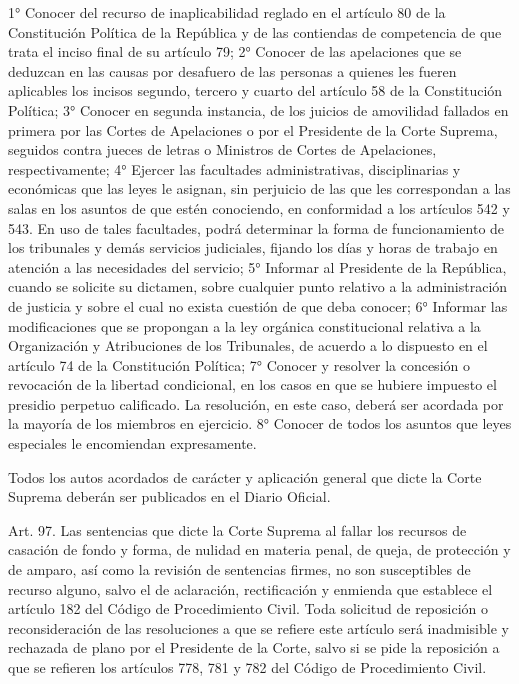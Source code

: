     1°  Conocer del recurso de inaplicabilidad reglado en el artículo 80 de la Constitución Política de la República y de las contiendas de competencia de que trata el inciso final de su artículo 79;
    2°  Conocer de las apelaciones que se deduzcan en las causas por desafuero de las personas a quienes les fueren aplicables los incisos segundo, tercero y cuarto del artículo 58 de la Constitución Política;
    3°  Conocer en segunda instancia, de los juicios de amovilidad fallados en primera por las Cortes de Apelaciones o por el Presidente de la Corte Suprema, seguidos contra jueces de letras o Ministros de Cortes de Apelaciones, respectivamente;
    4°  Ejercer las facultades administrativas, disciplinarias y económicas que las leyes le asignan, sin perjuicio de las que les correspondan a las salas en los asuntos de que estén conociendo, en conformidad a los artículos 542 y 543. En uso de tales facultades, podrá determinar la forma de funcionamiento de los tribunales y demás servicios judiciales, fijando los días y horas de trabajo en atención a las necesidades del servicio;
    5°  Informar al Presidente de la República, cuando se solicite su dictamen, sobre cualquier punto relativo a la administración de justicia y sobre el cual no exista cuestión de que deba conocer;
    6°  Informar las modificaciones que se propongan a la ley orgánica constitucional relativa a la Organización y Atribuciones de los Tribunales, de acuerdo a lo dispuesto en el artículo 74 de la Constitución Política;
    7°  Conocer y resolver la concesión o revocación de la libertad condicional, en los casos en que se hubiere impuesto el presidio perpetuo calificado.
    La resolución, en este caso, deberá ser acordada por la mayoría de los miembros en ejercicio.
    8°  Conocer de todos los asuntos que leyes especiales le encomiendan expresamente.

    Todos los autos acordados de carácter y aplicación general que dicte la Corte Suprema deberán ser publicados en el Diario Oficial.


    Art. 97. Las sentencias que dicte la Corte Suprema al fallar los recursos de casación de fondo y forma, de nulidad en materia penal, de queja, de protección y de amparo, así como la revisión de sentencias firmes, no son susceptibles de recurso alguno, salvo el de aclaración, rectificación y enmienda que establece el artículo 182 del Código de Procedimiento Civil.
    Toda solicitud de reposición o reconsideración de las resoluciones a que se refiere este artículo será inadmisible y rechazada de plano por el Presidente de la Corte, salvo si se pide la reposición a que se refieren los artículos 778, 781 y 782 del Código de Procedimiento Civil.


